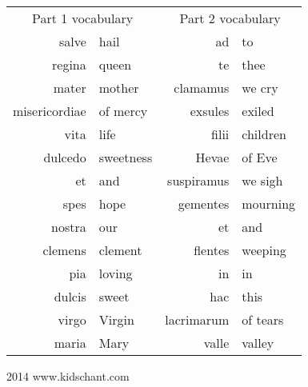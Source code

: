 \documentclass{article}
\begin{document}
\setlength{\tabcolsep}{12pt}

\hskip 3cm\begin{tabular}{r l r l}
\multicolumn{2}{c}{Part 1 vocabulary} & \multicolumn{2}{c}{Part 2 vocabulary} \\
salve & hail & ad & to \\
regina & queen & te & thee \\
mater & mother & clamamus & we cry \\
misericordiae & of mercy & exsules & exiled \\
vita & life & filii & children \\
dulcedo & sweetness & Hevae & of Eve \\
et & and & suspiramus & we sigh \\
spes & hope & gementes & mourning \\
nostra & our & et & and \\
clemens & clement & flentes & weeping \\
pia & loving & in & in \\
dulcis & sweet & hac & this \\
virgo & Virgin & lacrimarum & of tears \\
maria & Mary & valle & valley \\
\end{tabular}

\vfill

\centerline{2014 www.kidschant.com}


\eject
\end{document}
